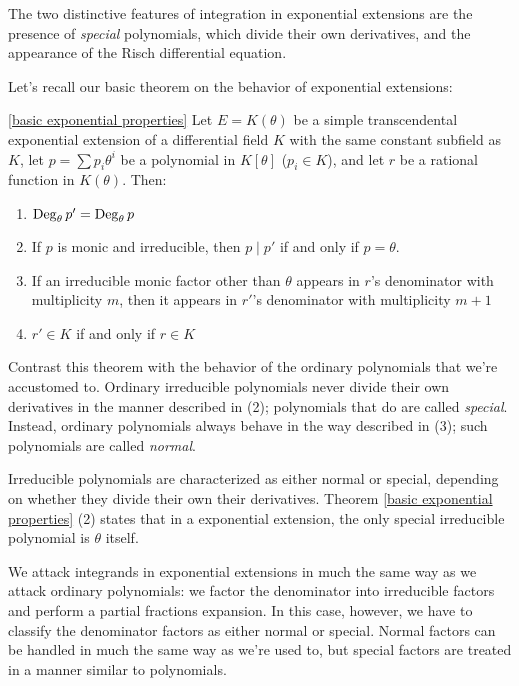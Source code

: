 
\setcounter{chapter}{5}

The two distinctive features of integration in exponential extensions
are the presence of {\it special} polynomials, which divide their own
derivatives, and the appearance of the Risch differential equation.

Let's recall our basic theorem on the behavior of exponential extensions:

\begin{customthm}{\ref{basic exponential properties}}
Let $E=K(\theta)$ be a simple transcendental exponential extension of
a differential field $K$ with the same constant subfield as $K$,
let $p=\sum p_i \theta^i$ be a polynomial in $K[\theta]$ ($p_i \in K$),
and let $r$ be a rational function in $K(\theta)$. Then:

\begin{enumerate}
\item ${\rm Deg}_\theta\, p' = {\rm Deg}_\theta\, p$
\item If $p$ is monic and irreducible, then $p \mid p'$ if and only if $p = \theta$.
\item If an irreducible monic factor other than $\theta$ appears in $r$'s
denominator with multiplicity $m$,
then it appears in $r'$'s denominator with multiplicity $m+1$
\item $r' \in K$ if and only if $r \in K$
\end{enumerate}

\end{customthm}

Contrast this theorem with the behavior of the ordinary polynomials
that we're accustomed to.  Ordinary irreducible polynomials never divide their own derivatives in the
manner described in (2); polynomials that do are called {\it special}.
Instead, ordinary polynomials always behave in the way described in
(3); such polynomials are called {\it normal}.

Irreducible polynomials are characterized as either normal or special,
depending on whether they divide their own their derivatives.
Theorem \ref{basic exponential properties} (2) states that in a
exponential extension, the only special irreducible polynomial is
$\theta$ itself.

\begin{comment}
In a hypertangent extension, the only special
irreducible polynomial is $(\theta^2+1)$.
\end{comment}

We attack integrands in exponential extensions in much the same way as
we attack ordinary polynomials: we factor the denominator into
irreducible factors and perform a partial fractions expansion.  In
this case, however, we have to classify the denominator factors as
either normal or special.  Normal factors can be handled in much the
same way as we're used to, but special factors are treated in a manner
similar to polynomials.

